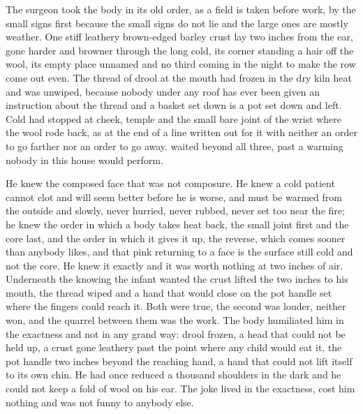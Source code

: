The surgeon took the body in its old order, as a field is taken before work, by the small signs first because the small signs do not lie and the large ones are mostly weather. One stiff leathery brown-edged barley crust lay two inches from the ear, gone harder and browner through the long cold, its corner standing a hair off the wool, its empty place unnamed and no third coming in the night to make the row come out even. The thread of drool at the mouth had frozen in the dry kiln heat and was unwiped, because nobody under any roof has ever been given an instruction about the thread and a basket set down is a pot set down and left. Cold had stopped at cheek, temple and the small bare joint of the wrist where the wool rode back, as at the end of a line written out for it with neither an order to go farther nor an order to go away.  waited beyond all three, past a warming nobody in this house would perform.

He knew the composed face that was not composure. He knew a cold patient cannot clot and will seem better before he is worse, and must be warmed from the outside and slowly, never hurried, never rubbed, never set too near the fire; he knew the order in which a body takes heat back, the small joint first and the core last, and the order in which it gives it up, the reverse, which comes sooner than anybody likes, and that pink returning to a face is the surface still cold and not the core. He knew it exactly and it was worth nothing at two inches of air. Underneath the knowing the infant wanted the crust lifted the two inches to his mouth, the thread wiped and a hand that would close on the pot handle set where the fingers could reach it. Both were true, the second was louder, neither won, and the quarrel between them was the work. The body humiliated him in the exactness and not in any grand way: drool frozen, a head that could not be held up, a crust gone leathery past the point where any child would eat it, the pot handle two inches beyond the reaching hand, a hand that could not lift itself to its own chin. He had once reduced a thousand shoulders in the dark and he could not keep a fold of wool on his ear. The joke lived in the exactness, cost him nothing and was not funny to anybody else.

\scenebreak

